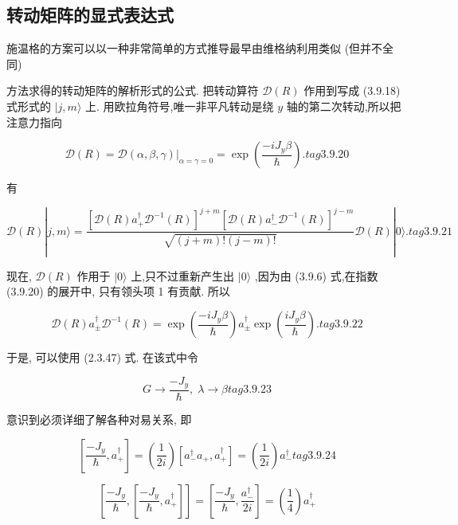 \subsection{转动矩阵的显式表达式}

施温格的方案可以以一种非常简单的方式推导最早由维格纳利用类似 (但并不全同)

方法求得的转动矩阵的解析形式的公式. 把转动算符 $\mathcal{D}\left( R\right)$ 作用到写成 (3.9.18) 式形式的 $|j, m\rangle$ 上. 用欧拉角符号,唯一非平凡转动是绕 $y$ 轴的第二次转动,所以把注意力指向

$$
\mathcal{D}\left( R\right) = {\left. \mathcal{D}\left( \alpha ,\beta ,\gamma \right) \right| }_{\alpha = \gamma = 0} = \exp \left( \frac{-i{J}_{y}\beta }{\hslash }\right) . tag{3.9.20}
$$

有

$$
\mathcal{D}\left( R\right) \left| {j, m\rangle = \frac{{\left\lbrack \mathcal{D}\left( R\right) {a}_{ + }^{ \dagger }{\mathcal{D}}^{-1}\left( R\right) \right\rbrack }^{j + m}{\left\lbrack \mathcal{D}\left( R\right) {a}_{ - }^{ \dagger }{\mathcal{D}}^{-1}\left( R\right) \right\rbrack }^{j - m}}{\sqrt{\left( {j + m}\right) !\left( {j - m}\right) !}}\mathcal{D}\left( R\right) }\right| 0\rangle . tag{3.9.21}
$$

现在, $\mathcal{D}\left( R\right)$ 作用于 $|0\rangle$ 上,只不过重新产生出 $|0\rangle$ ,因为由 (3.9.6) 式,在指数 (3.9.20) 的展开中, 只有领头项 1 有贡献. 所以

$$
\mathcal{D}\left( R\right) {a}_{ \pm }^{ \dagger }{\mathcal{D}}^{-1}\left( R\right) = \exp \left( \frac{-i{J}_{y}\beta }{\hslash }\right) {a}_{ \pm }^{ \dagger }\exp \left( \frac{i{J}_{y}\beta }{\hslash }\right) . tag{3.9.22}
$$

于是, 可以使用 (2.3.47) 式. 在该式中令

$$
G \rightarrow \frac{-{J}_{y}}{\hslash },\;\lambda \rightarrow \beta tag{3. 9.23}
$$

意识到必须详细了解各种对易关系, 即

$$
\left\lbrack {\frac{-{J}_{y}}{\hslash },{a}_{ + }^{ \dagger }}\right\rbrack = \left( \frac{1}{2i}\right) \left\lbrack {{a}_{ - }^{ \dagger }{a}_{ + },{a}_{ + }^{ \dagger }}\right\rbrack = \left( \frac{1}{2i}\right) {a}_{ - }^{ \dagger } tag{3. 9.24}
$$

$$
\left\lbrack {\frac{-{J}_{y}}{\hslash },\left\lbrack {\frac{-{J}_{y}}{\hslash },{a}_{ + }^{ \dagger }}\right\rbrack }\right\rbrack = \left\lbrack {\frac{-{J}_{y}}{\hslash },\frac{{a}_{ - }^{ \dagger }}{2i}}\right\rbrack = \left( \frac{1}{4}\right) {a}_{ + }^{ \dagger }
$$

